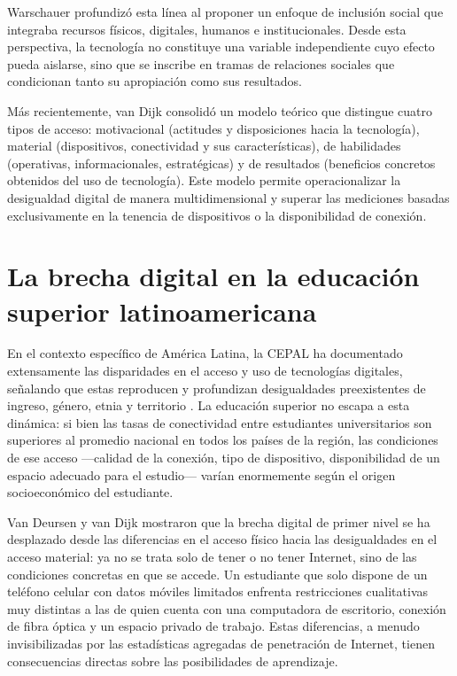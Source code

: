 \documentclass{article}
\begin{document}
Warschauer \autocite{2562-WARSCHAUER2004} profundizó esta línea al proponer un enfoque de inclusión social que integraba recursos físicos, digitales, humanos e institucionales. Desde esta perspectiva, la tecnología no constituye una variable independiente cuyo efecto pueda aislarse, sino que se inscribe en tramas de relaciones sociales que condicionan tanto su apropiación como sus resultados.

Más recientemente, van Dijk \autocite{2563-VANDIJK2020} consolidó un modelo teórico que distingue cuatro tipos de acceso: motivacional (actitudes y disposiciones hacia la tecnología), material (dispositivos, conectividad y sus características), de habilidades (operativas, informacionales, estratégicas) y de resultados (beneficios concretos obtenidos del uso de tecnología). Este modelo permite operacionalizar la desigualdad digital de manera multidimensional y superar las mediciones basadas exclusivamente en la tenencia de dispositivos o la disponibilidad de conexión.


\section{La brecha digital en la educación superior latinoamericana}
En el contexto específico de América Latina, la CEPAL ha documentado extensamente las disparidades en el acceso y uso de tecnologías digitales, señalando que estas reproducen y profundizan desigualdades preexistentes de ingreso, género, etnia y territorio \autocite{2566-CEPAL2021}. La educación superior no escapa a esta dinámica: si bien las tasas de conectividad entre estudiantes universitarios son superiores al promedio nacional en todos los países de la región, las condiciones de ese acceso —calidad de la conexión, tipo de dispositivo, disponibilidad de un espacio adecuado para el estudio— varían enormemente según el origen socioeconómico del estudiante.

Van Deursen y van Dijk \autocite{2564-VANDEURSEN2019} mostraron que la brecha digital de primer nivel se ha desplazado desde las diferencias en el acceso físico hacia las desigualdades en el acceso material: ya no se trata solo de tener o no tener Internet, sino de las condiciones concretas en que se accede. Un estudiante que solo dispone de un teléfono celular con datos móviles limitados enfrenta restricciones cualitativas muy distintas a las de quien cuenta con una computadora de escritorio, conexión de fibra óptica y un espacio privado de trabajo. Estas diferencias, a menudo invisibilizadas por las estadísticas agregadas de penetración de Internet, tienen consecuencias directas sobre las posibilidades de aprendizaje.
\end{document}
